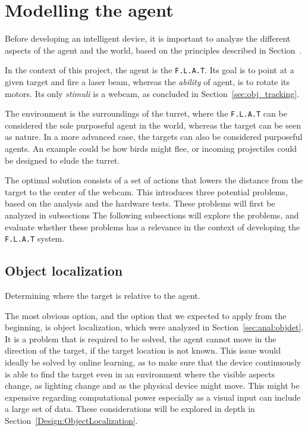 \section{Modelling the agent}\label{Design:MI}
Before developing an intelligent device, it is important to analyze the different aspects of the agent and the world, based on the principles described in Section~.


In the context of this project, the agent is the \texttt{F.L.A.T}.
Its goal is to point at a given target and fire a laser beam, whereas the \textit{ability} of agent, is to rotate its motors.
Its only \textit{stimuli} is a webcam, as concluded in Section~\ref{sec:obj_tracking}.

The environment is the surroundings of the turret, where the \texttt{F.L.A.T} can be considered the sole purposeful agent in the world, whereas the target can be seen as nature.
In a more advanced case, the targets can also be considered purposeful agents.
An example could be how birds might flee, or incoming projectiles could be designed to elude the turret.

The optimal solution consists of a set of actions that lowers the distance from the target to the center of the webcam.
This introduces three potential problems, based on the analysis and the hardware tests.
These problems will first be analyzed in subsections
The following subsections  will explore the problems, and evaluate whether these problems has a relevance in the context of developing the \texttt{F.L.A.T} system. 


\subsection{Object localization}
Determining where the target is relative to the agent.


The most obvious option, and the option that we expected to apply from the beginning, is object localization, which were analyzed in Section~\ref{sec:anal:objdet}.
It is a problem that is required to be solved, the agent cannot move in the direction of the target, if the target location is not known.
This issue would ideally be solved by online learning, as to make sure that the device continuously is able to find the target even in an environment where the visible aspects change, as lighting change and as the physical device might move. 
This might be expensive regarding computational power especially as a visual input can include a large set of data.
These considerations will be explored in depth in Section~\ref{Design:ObjectLocalization}.


